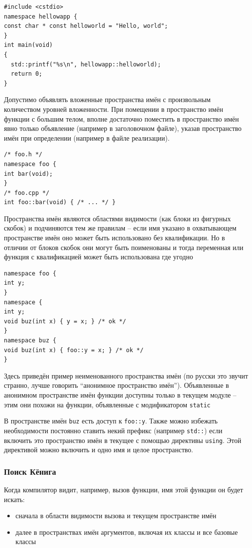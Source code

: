 \documentclass[a4paper,12pt,oneside]{article}
\begin{document}
\begin{lstlisting}
#include <cstdio>
namespace hellowapp {
const char * const helloworld = "Hello, world";
}
int main(void)
{
  std::printf("%s\n", hellowapp::helloworld);
  return 0;
}
\end{lstlisting}

Допустимо объявлять вложенные пространства имён с произвольным количеством уровней вложенности. При помещении в пространство имён функции с большим телом, вполне достаточно поместить в пространство имён явно только объявление (например в заголовочном файле), указав пространство имён при определении (например в файле реализации).

\begin{lstlisting}
/* foo.h */
namespace foo {
int bar(void);
}
/* foo.cpp */
int foo::bar(void) { /* ... */ }
\end{lstlisting}

Пространства имён являются областями видимости (как блоки из фигурных скобок) и подчиняются тем же правилам – если имя указано в охватывающем пространстве имён оно может быть использовано без квалификации. Но в отличии от блоков скобок они могут быть поименованы и тогда переменная или функция с квалификацией может быть использована где угодно

\begin{lstlisting}
namespace foo {
int y;
}
namespace {
int y;
void buz(int x) { y = x; } /* ok */
}
namespace buz {
void buz(int x) { foo::y = x; } /* ok */
}
\end{lstlisting}

Здесь приведён пример неименованного пространства имён (по русски это звучит странно, лучше говорить ``анонимное пространство имён''). Объявленные в анонимном пространстве имён функции доступны только в текущем модуле -- этим они похожи на функции, объявленные с модификатором \lstinline!static!

В пространстве имён \lstinline!buz! есть доступ к \lstinline!foo::y!. Также можно избежать необходимости постоянно ставить некий префикс (например \lstinline!std::!) если включить это пространство имён в текущее с помощью директивы \lstinline!using!. Этой директивой можно включить и одно имя и целое пространство.

\subsubsection{Поиск Кёнига}

Когда компилятор видит, например, вызов функции, имя этой функции он будет искать:
\begin{itemize}
\item
сначала в области видимости вызова и текущем пространстве имён
\item
далее в пространствах имён аргументов, включая их классы и все базовые классы
\end{itemize}
\end{document}
